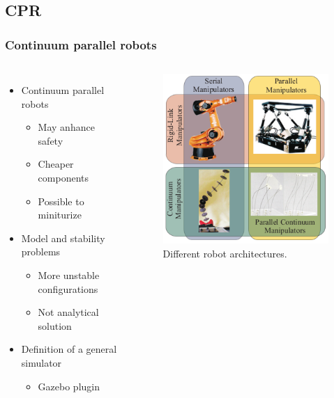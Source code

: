 \documentclass[compress]{thesisbeamer}
\begin{document}
        \subsection{CPR}
        \begin{frame}
        	\frametitle{Continuum parallel robots}
			\begin{columns}
			\begin{itemize}%
  				\item Continuum parallel robots 
  				\begin{itemize}%
   					\item May anhance safety
   					\item Cheaper components 
   					\item Possible to miniturize
  				\end{itemize}
  				\item Model and stability problems
  				\begin{itemize}%
   					\item More unstable configurations
   					\item Not analytical solution
  				\end{itemize}
  				\item Definition of a general simulator
  				\begin{itemize}
  					\item Gazebo plugin
  				\end{itemize}
 			\end{itemize}
			\vspace{2cm}
			\begin{figure}[h]
				\centering
				\includegraphics[width=\textwidth]{images/serial_parall_robots}
				\caption{Different robot architectures.}
			\end{figure}
			\end{columns}
		\end{frame}
\end{document}
